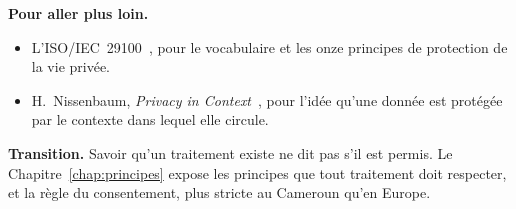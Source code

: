 \begin{boxinfo}
\textbf{Pour aller plus loin.}
\begin{itemize}
    \item L'ISO/IEC~29100~\cite{iso29100}, pour le vocabulaire et les onze
          principes de protection de la vie privée.
    \item H.~Nissenbaum, \textit{Privacy in Context}~\cite{nissenbaum2010},
          pour l'idée qu'une donnée est protégée par le contexte dans lequel
          elle circule.
\end{itemize}
\end{boxinfo}

\begin{boxinfo}
\textbf{Transition.} Savoir qu'un traitement existe ne dit pas s'il est
permis. Le Chapitre~\ref{chap:principes} expose les principes que tout
traitement doit respecter, et la règle du consentement, plus stricte au
Cameroun qu'en Europe.
\end{boxinfo}
